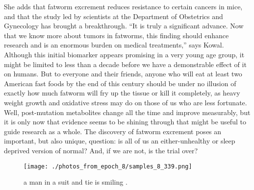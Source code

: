 \documentclass{article}%
\begin{document}
She adds that fatworm excrement reduces resistance to certain cancers in mice, and that the study led by scientists at the Department of Obstetrics and Gynecology has brought a breakthrough.\newline%
“It is truly a significant advance. Now that we know more about tumors in fatworms, this finding should enhance research and is an enormous burden on medical treatments,” says Kowal.\newline%
Although this initial biomarker appears promising in a very young age group, it might be limited to less than a decade before we have a demonstrable effect of it on humans. But to everyone and their friends, anyone who will eat at least two American fast foods by the end of this century should be under no illusion of exactly how much fatworm will fry up the tissue or kill it completely, as heavy weight growth and oxidative stress may do on those of us who are less fortunate.\newline%
Well, post{-}mutation metabolites change all the time and improve measurably, but it is only now that evidence seems to be shining through that might be useful to guide research as a whole. The discovery of fatworm excrement poses an important, but also unique, question: is all of us an either{-}unhealthy or sleep deprived version of normal? And, if we are not, is the trial over?\newline%

%


\begin{figure}[h!]%
\centering%
\texttt{[image: ./photos\_from\_epoch\_8/samples\_8\_339.png]}%
\caption{a man in a suit and tie is smiling .}%
\end{figure}

%
\end{document}
